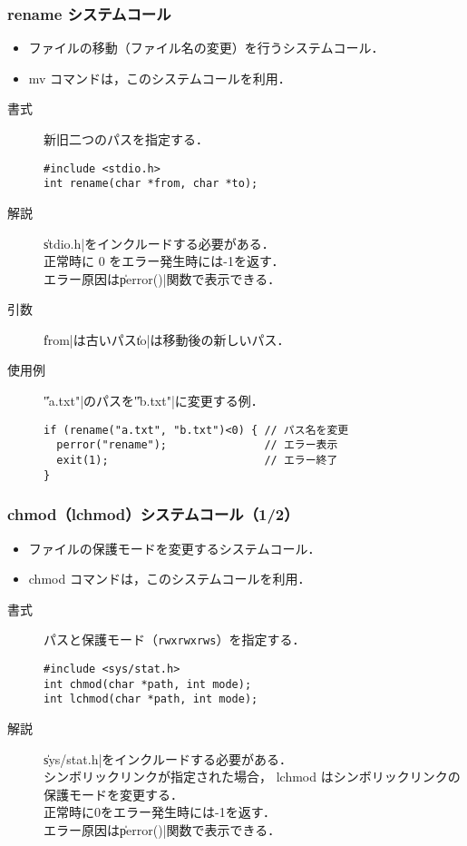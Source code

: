 \documentclass{beamer}                 %
\begin{document}
\begin{frame}[fragile]
  \frametitle{rename システムコール}
  \begin{itemize}
  \item ファイルの移動（ファイル名の変更）を行うシステムコール．
  \item mv コマンドは，このシステムコールを利用．
  \end{itemize}

  \begin{description}
  \item[書式] 新旧二つのパスを指定する．
\begin{verbatim}
#include <stdio.h>
int rename(char *from, char *to);
\end{verbatim}

  \item[解説] \|stdio.h|をインクルードする必要がある．\\
    正常時に 0 をエラー発生時には-1を返す．\\
    エラー原因は\|perror()|関数で表示できる．

  \item[引数] \|from|は古いパス\|to|は移動後の新しいパス．

\item[使用例] \|"a.txt"|のパスを\|"b.txt"|に変更する例．
\begin{verbatim}
if (rename("a.txt", "b.txt")<0) { // パス名を変更
  perror("rename");               // エラー表示
  exit(1);                        // エラー終了
}
\end{verbatim}
\end{description}
\end{frame}

\begin{frame}[fragile]
  \frametitle{chmod（lchmod）システムコール（1/2）}
  \begin{itemize}
  \item ファイルの保護モードを変更するシステムコール．
  \item chmod コマンドは，このシステムコールを利用．
  \end{itemize}

  \begin{description}
  \item[書式] パスと保護モード（\texttt{rwxrwxrws}）を指定する．
\begin{verbatim}
#include <sys/stat.h>
int chmod(char *path, int mode);
int lchmod(char *path, int mode);
\end{verbatim}

  \item[解説] \|sys/stat.h|をインクルードする必要がある．\\
    シンボリックリンクが指定された場合，
    lchmod はシンボリックリンクの保護モードを変更する．\\
    正常時に0をエラー発生時には-1を返す．\\
    エラー原因は\|perror()|関数で表示できる．
  \end{description}
\end{frame}
\end{document}
